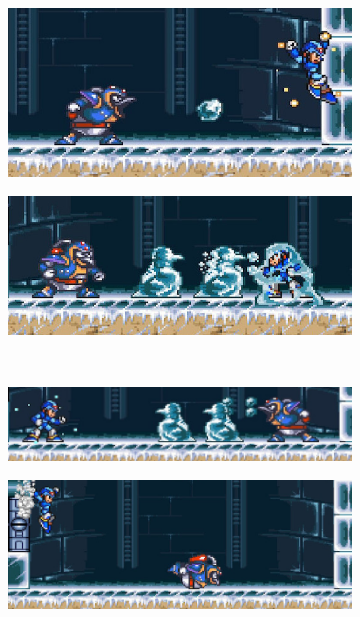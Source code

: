 \begin{figure}[h]
	\centering
	\begin{subfigure}{0.5\textwidth}
		\centering
		\includegraphics[width=\linewidth]{figures/X1/Chill_shot.jpg}
		\caption{}
	\end{subfigure}
	\begin{subfigure}{0.49\textwidth}
		\centering
		\includegraphics[width=\linewidth]{figures/X1/Chill_frozen.jpg}
		\caption{}
	\end{subfigure}\\
	\begin{subfigure}{0.5\textwidth}
		\centering
		\includegraphics[width=\linewidth]{figures/X1/Chill_shatter.jpg}
		\caption{}
	\end{subfigure}
	\begin{subfigure}{0.49\textwidth}
		\centering
		\includegraphics[width=\linewidth]{figures/X1/Chill_slide.jpg}

\end{subfigure}
\end{figure}
